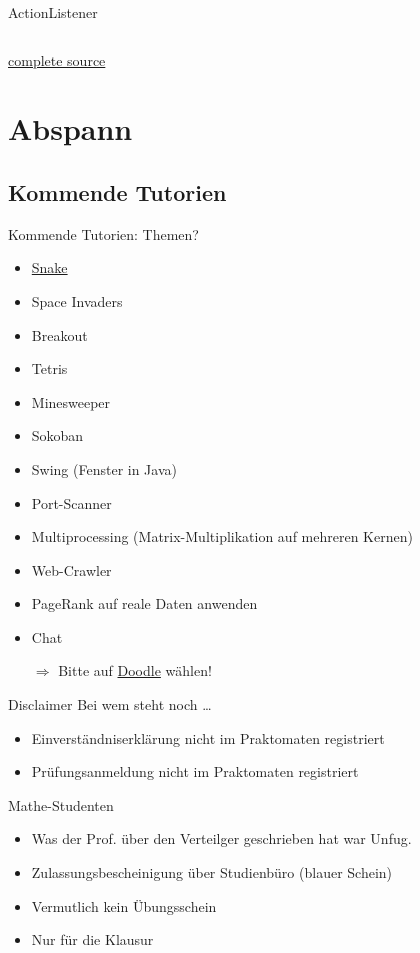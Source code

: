 \documentclass[usepdftitle=false,hyperref={pdfpagelabels=false}]{beamer}
\begin{document}
\begin{frame}{ActionListener}
    \inputminted[linenos=false, numbersep=5pt, tabsize=4, fontsize=\tiny]{java}{Swing2.java}
    {\tiny \href{http://martin-thoma.com/how-to-use-swing/}{complete source}}
\end{frame}



\section{Abspann}
\subsection{Kommende Tutorien}
\begin{frame}{Kommende Tutorien: Themen?}
  \begin{itemize}
    \item \href{http://zetcode.com/tutorials/javagamestutorial/}{Snake}
    \item Space Invaders
    \item Breakout
    \item Tetris
    \item Minesweeper
    \item Sokoban
    \item Swing (Fenster in Java)
    \item Port-Scanner
    \item Multiprocessing (Matrix-Multiplikation auf mehreren Kernen)
    \item Web-Crawler
    \item PageRank auf reale Daten anwenden
    \item Chat
    \item[$\Rightarrow$] Bitte auf \href{http://www.doodle.com/drn5f9i94zedws5n}{Doodle} wählen!
  \end{itemize}
\end{frame}

\begin{frame}{Disclaimer}
    Bei wem steht noch \dots
    \begin{itemize}
        \item Einverständniserklärung nicht im Praktomaten registriert
        \item Prüfungsanmeldung nicht im Praktomaten registriert
    \end{itemize}
\end{frame}

\begin{frame}{Mathe-Studenten}
    \begin{itemize}
        \item Was der Prof. über den Verteilger geschrieben hat war Unfug.
        \item Zulassungsbescheinigung über Studienbüro (blauer Schein)
        \item Vermutlich kein Übungsschein
        \item Nur für die Klausur
    \end{itemize}
\end{frame}
\end{document}
